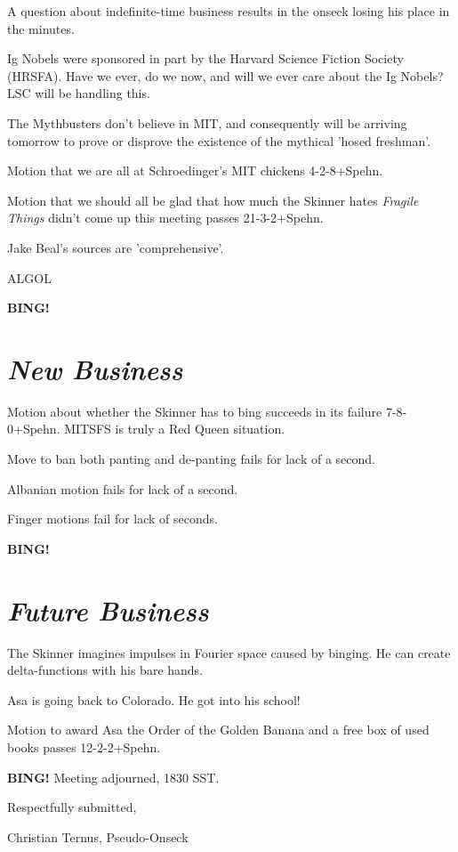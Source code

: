 \documentclass[10pt]{article}
\newcommand{\bing}{{\bf BING!} }
\newcommand{\goto}[1]{\bing \vskip 12pt \section*{{\em{#1}}}}
\begin{document}
A question about indefinite-time business results in the onseck losing
his place in the minutes.

Ig Nobels were sponsored in part by the Harvard Science Fiction
Society (HRSFA). Have we ever, do we now, and will we ever care about
the Ig Nobels? LSC will be handling this.

The Mythbusters don't believe in MIT, and consequently will be
arriving tomorrow to prove or disprove the existence of the mythical
'hosed freshman'.

Motion that we are all at Schroedinger's MIT chickens 4-2-8+Spehn.

Motion that we should all be glad that how much the Skinner hates
\emph{Fragile Things} didn't come up this meeting passes 21-3-2+Spehn.

Jake Beal's sources are 'comprehensive'. 

ALGOL

\goto{New Business}

Motion about whether the Skinner has to bing succeeds in its failure
7-8-0+Spehn. MITSFS is truly a Red Queen situation.

Move to ban both panting and de-panting fails for lack of a second.

Albanian motion fails for lack of a second.

Finger motions fail for lack of seconds.

\goto{Future Business}

The Skinner imagines impulses in Fourier space caused by binging. He
can create delta-functions with his bare hands.

Asa is going back to Colorado. He got into his school!

Motion to award Asa the Order of the Golden Banana and a free box of used books passes 12-2-2+Spehn.

\bing
\noindent
Meeting adjourned, 1830 SST.

\vspace{18pt}

\centerline{Respectfully submitted,}
\centerline{Christian Ternus, Pseudo-Onseck}
\end{document}
